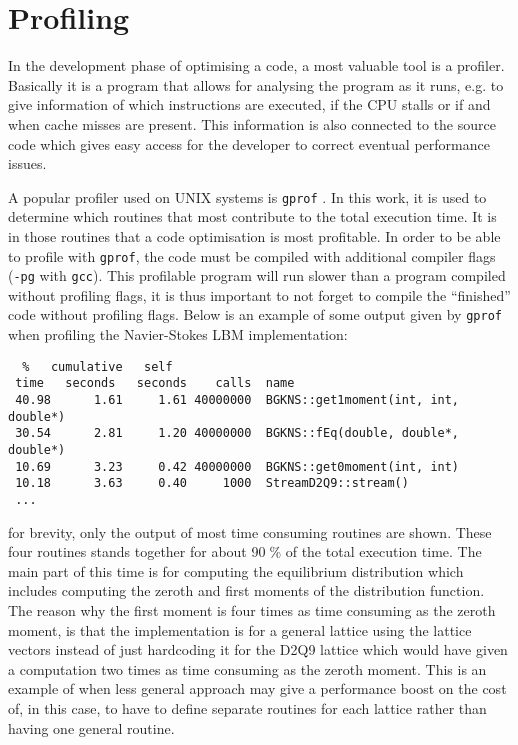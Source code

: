 \section{Profiling}
In the development phase of optimising a code, a most valuable tool is
a profiler. Basically it is a program that allows for analysing the
program as it runs, e.g. to give information of which instructions are
executed, if the CPU stalls or if and when cache misses are
present. This information is also connected to the source code which
gives easy access for the developer to correct eventual performance
issues.

A popular profiler used on UNIX systems is \texttt{gprof}
\cite{gprof}. In this work, it is used to determine which routines
that most contribute to the total execution time. It is in those
routines that a code optimisation is most profitable. In order to be
able to profile with \texttt{gprof}, the code must be compiled with
additional compiler flags (\texttt{-pg} with \texttt{gcc}). This
profilable program will run slower than a program compiled without
profiling flags, it is thus important to not forget to compile the
``finished'' code without profiling flags. Below is an example of some
output given by \texttt{gprof} when profiling the Navier-Stokes LBM
implementation:

\begin{verbatim}
  %   cumulative   self                         
 time   seconds   seconds    calls  name    
 40.98      1.61     1.61 40000000  BGKNS::get1moment(int, int, double*)
 30.54      2.81     1.20 40000000  BGKNS::fEq(double, double*, double*)
 10.69      3.23     0.42 40000000  BGKNS::get0moment(int, int)
 10.18      3.63     0.40     1000  StreamD2Q9::stream()
 ...
\end{verbatim}
for brevity, only the output of most time consuming routines are
shown. These four routines stands together for about 90$\;$\% of the
total execution time. The main part of this time is for computing the
equilibrium distribution which includes computing the zeroth and first
moments of the distribution function. The reason why the first moment
is four times as time consuming as the zeroth moment, is that the
implementation is for a general lattice using the lattice vectors
instead of just hardcoding it for the D2Q9 lattice which would have
given a computation two times as time consuming as the zeroth moment.
This is an example of when less general approach may give a
performance boost on the cost of, in this case, to have to define
separate routines for each lattice rather than having one general
routine.

